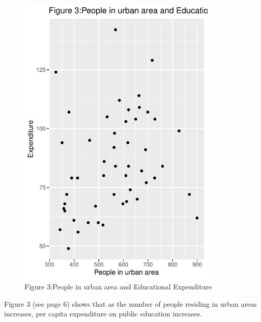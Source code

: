 \documentclass[12pt,letterpaper]{article}
\begin{document}
\begin{itemize}
		  
		\vspace{.5cm}
	    \begin{figure}\centering
			\caption{Figure 3:People in urban area and Educational Expenditure}
			\includegraphics[width=0.85\textwidth]{Rplot3.pdf}
	     \end{figure}
		Figure 3 (see page 6) shows that as the number of people residing in urban areas increases, per capita expenditure on public education increases.
		\vspace{.5cm}	
		

\end{itemize}
\end{document}
